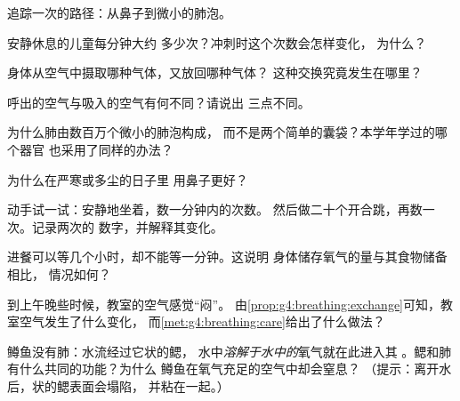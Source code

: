 \begin{exercise}[$\star$]\label{exo:g4:breathing:2}
追踪一次的路径：从鼻子到微小的肺泡。
\end{exercise}

\begin{exercise}[$\star$]\label{exo:g4:breathing:3}
安静休息的儿童每分钟大约
多少次？冲刺时这个次数会怎样变化，
为什么？
\end{exercise}

\begin{exercise}[$\star$]\label{exo:g4:breathing:4}
身体从空气中摄取哪种气体，又放回哪种气体？
这种交换究竟发生在哪里？
\end{exercise}

\begin{exercise}[$\star$]\label{exo:g4:breathing:5}
呼出的空气与吸入的空气有何不同？请说出
三点不同。
\end{exercise}

\begin{exercise}[$\star$]\label{exo:g4:breathing:6}
为什么肺由数百万个微小的肺泡构成，
而不是两个简单的囊袋？本学年学过的哪个器官
也采用了同样的办法？
\end{exercise}

\begin{exercise}[$\star$]\label{exo:g4:breathing:7}
为什么在严寒或多尘的日子里
用鼻子更好？
\end{exercise}

\begin{exercise}[$\star$]\label{exo:g4:breathing:8}
动手试一试：安静地坐着，数一分钟内的次数。
然后做二十个开合跳，再数一次。记录两次的
数字，并解释其变化。
\end{exercise}

\begin{exercise}[$\star\star$]\label{exo:g4:breathing:9}
进餐可以等几个小时，却不能等一分钟。这说明
身体储存氧气的量与其食物储备相比，
情况如何？
\end{exercise}

\begin{exercise}[$\star\star$]\label{exo:g4:breathing:10}
到上午晚些时候，教室的空气感觉“闷”。
由\cref{prop:g4:breathing:exchange}可知，教室空气发生了什么变化，
而\cref{met:g4:breathing:care}给出了什么做法？
\end{exercise}

\begin{exercise}[$\star\star\star$]\label{exo:g4:breathing:11}
鳟鱼没有肺：水流经过它状的鳃，
水中\emph{溶解于水中的}氧气就在此进入其
。鳃和肺有什么共同的功能？为什么
鳟鱼在氧气充足的空气中却会窒息？
（提示：离开水后，状的鳃表面会塌陷，
并粘在一起。）
\end{exercise}
